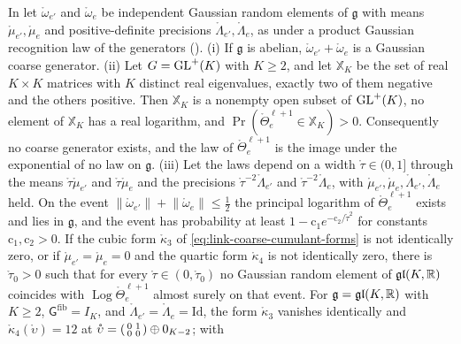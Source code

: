 In  let \(\mathring\omega_{e'}\) and \(\mathring\omega_e\) be independent Gaussian random
elements of \(\mathfrak g\) with means \(\mathring\mu_{e'},\mathring\mu_e\) and positive-definite precisions
\(\mathring\Lambda_{e'},\mathring\Lambda_e\), as under a product Gaussian recognition law of the generators
().
(i) If \(\mathfrak g\) is abelian, \(\mathring\omega_{e'}+\mathring\omega_e\) is a Gaussian coarse generator.
(ii) Let \(G=\mathrm{GL}^+(K)\) with \(K\geq2\), and let \(\mathbb X_K\) be the set of real \(K\times K\) matrices with
\(K\) distinct real eigenvalues, exactly two of them negative and the others positive. Then \(\mathbb X_K\)
is a nonempty open subset of \(\mathrm{GL}^+(K)\), no element of \(\mathbb X_K\) has a real logarithm, and
\(\Pr(\mathring\Theta^{\ell+1}_e\in\mathbb X_K)>0\). Consequently no coarse generator exists, and the law of
\(\mathring\Theta^{\ell+1}_e\) is the image under the exponential of no law on \(\mathfrak g\).
(iii) Let the laws depend on a width \(\mathring\tau\in(0,1]\) through the means
\(\mathring\tau\mathring\mu_{e'}\) and \(\mathring\tau\mathring\mu_e\) and the precisions
\(\mathring\tau^{-2}\mathring\Lambda_{e'}\) and \(\mathring\tau^{-2}\mathring\Lambda_e\), with
\(\mathring\mu_{e'},\mathring\mu_e,\mathring\Lambda_{e'},\mathring\Lambda_e\) held. On the event \(\lVert\mathring\omega_{e'}\rVert+\lVert\mathring\omega_e\rVert\leq\frac12\) the principal
logarithm of \(\mathring\Theta^{\ell+1}_e\) exists and lies in \(\mathfrak g\), and the event has probability
at least \(1-\mathrm c_1e^{-\mathrm c_2/\mathring\tau^2}\) for constants \(\mathrm c_1,\mathrm c_2>0\). If the
cubic form \(\mathring\kappa_3\) of \eqref{eq:link-coarse-cumulant-forms} is not identically zero, or if
\(\mathring\mu_{e'}=\mathring\mu_e=0\) and the quartic form \(\mathring\kappa_4\) is not identically zero,
there is \(\mathring\tau_0>0\) such that for every \(\mathring\tau\in(0,\mathring\tau_0)\) no Gaussian random
element of \(\mathfrak{gl}(K,\mathbb R)\) coincides with \(\operatorname{Log}\mathring\Theta^{\ell+1}_e\) almost
surely on that event. For \(\mathfrak g=\mathfrak{gl}(K,\mathbb R)\) with \(K\geq2\), \(\mathsf G^{\mathrm{fib}}=I_K\),
and \(\mathring\Lambda_{e'}=\mathring\Lambda_e=\mathrm{Id}\), the form \(\mathring\kappa_3\) vanishes
identically and \(\mathring\kappa_4(\mathring\upsilon)=12\) at
\(\mathring\upsilon=\begin{psmallmatrix}0&1\\0&0\end{psmallmatrix}\oplus0_{K-2}\); with
